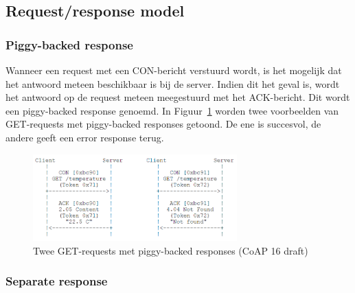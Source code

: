 \subsection{Request/response model}

\subsubsection{Piggy-backed response}

Wanneer een request met een CON-bericht verstuurd wordt, is het mogelijk dat het antwoord meteen beschikbaar is bij de server. Indien dit het geval is, wordt het antwoord op de request meteen meegestuurd met het ACK-bericht. Dit wordt een piggy-backed response genoemd. In Figuur~\ref{fig:CoAPPiggyBacked} worden twee voorbeelden van GET-requests met piggy-backed responses getoond. De ene is succesvol, de andere geeft een error response terug.
\begin{figure}[h]
\vspace{10pt}
\centering
\includegraphics[width=0.7\textwidth]{fig/CoAPPiggyBacked}
\caption{Twee GET-requests met piggy-backed responses (CoAP 16 draft)}
\label{fig:CoAPPiggyBacked}
\vspace{-20pt}
\end{figure}

\newpage

\subsubsection{Separate response} \label{separate}

